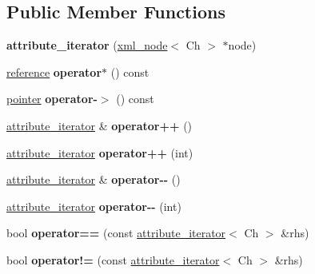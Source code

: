 \subsection*{Public Member Functions}
\begin{DoxyCompactItemize}
\item 
\mbox{\label{classrapidxml_1_1attribute__iterator_a1109344dead88533ae4dd68cea5d9613}} 
{\bfseries attribute\+\_\+iterator} (\mbox{\hyperlink{classrapidxml_1_1xml__node}{xml\+\_\+node}}$<$ Ch $>$ $\ast$node)
\item 
\mbox{\label{classrapidxml_1_1attribute__iterator_aa15f5f06d2a6199467a33aa19f4357aa}} 
\mbox{\hyperlink{classrapidxml_1_1xml__attribute}{reference}} {\bfseries operator$\ast$} () const
\item 
\mbox{\label{classrapidxml_1_1attribute__iterator_a499c7ed0e1835f029585d0a9ba25f446}} 
\mbox{\hyperlink{classrapidxml_1_1xml__attribute}{pointer}} {\bfseries operator-\/$>$} () const
\item 
\mbox{\label{classrapidxml_1_1attribute__iterator_afe7d15a4a1b228f97f1d4ebd4f3f6cca}} 
\mbox{\hyperlink{classrapidxml_1_1attribute__iterator}{attribute\+\_\+iterator}} \& {\bfseries operator++} ()
\item 
\mbox{\label{classrapidxml_1_1attribute__iterator_a82c8859b9eebd45caa3afc25b9e78c36}} 
\mbox{\hyperlink{classrapidxml_1_1attribute__iterator}{attribute\+\_\+iterator}} {\bfseries operator++} (int)
\item 
\mbox{\label{classrapidxml_1_1attribute__iterator_af22f1ad3c11d3269b43b49e29b89d7d1}} 
\mbox{\hyperlink{classrapidxml_1_1attribute__iterator}{attribute\+\_\+iterator}} \& {\bfseries operator-\/-\/} ()
\item 
\mbox{\label{classrapidxml_1_1attribute__iterator_af52a8562ab1b2c0391cdde79f55e4a6f}} 
\mbox{\hyperlink{classrapidxml_1_1attribute__iterator}{attribute\+\_\+iterator}} {\bfseries operator-\/-\/} (int)
\item 
\mbox{\label{classrapidxml_1_1attribute__iterator_ab1dc8dd11d21e145a4e3f76d46aead0d}} 
bool {\bfseries operator==} (const \mbox{\hyperlink{classrapidxml_1_1attribute__iterator}{attribute\+\_\+iterator}}$<$ Ch $>$ \&rhs)
\item 
\mbox{\label{classrapidxml_1_1attribute__iterator_a39e8cf336c324521fd9c720abf280d88}} 
bool {\bfseries operator!=} (const \mbox{\hyperlink{classrapidxml_1_1attribute__iterator}{attribute\+\_\+iterator}}$<$ Ch $>$ \&rhs)
\end{DoxyCompactItemize}



